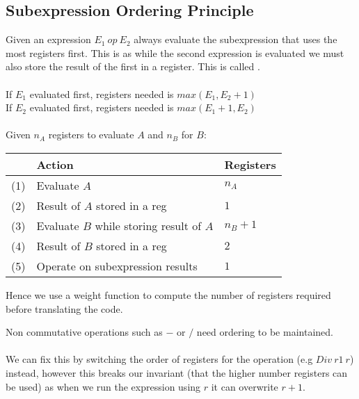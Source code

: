 \documentclass{report}
\begin{document}
        \subsection*{Subexpression Ordering Principle}
            Given an expression $E_1 \ op \ E_2$ always evaluate the subexpression that uses the most registers first. This is as while the second expression is evaluated we must also store the result of the first in a register. This is called .
            \\
            \\ If $E_1$ evaluated first, registers needed is $max(E_1, E_2 + 1)$
            \\ If $E_2$ evaluated first, registers needed is $max(E_1 + 1, E_2)$
            \\
            \\ Given $n_A$ registers to evaluate $A$ and $n_B$ for $B$:
            \begin{center}
                \begin{tabular}{l l l}
                    & \textbf{Action} & \textbf{Registers} \\
                    \hline
                    (1) & Evaluate $A$ & $n_A$ \\
                    (2) & Result of $A$ stored in a reg & $1$ \\
                    (3) & Evaluate $B$ while storing result of $A$ & $n_B + 1$ \\
                    (4) & Result of $B$ stored in a reg & $2$ \\
                    (5) & Operate on subexpression results & $1$ \\
                \end{tabular}
            \end{center}
            Hence we use a weight function to compute the number of registers required before translating the code.
            
            Non commutative operations such as $-$ or $/$ need ordering to be maintained. 
            \\
            \\ We can fix this by switching the order of registers for the operation (e.g $Div \ r1 \ r$) instead, however this breaks our invariant (that the higher number registers can be used) as when we run the expression using $r$ it can overwrite $r+1$.
        
\end{document}
